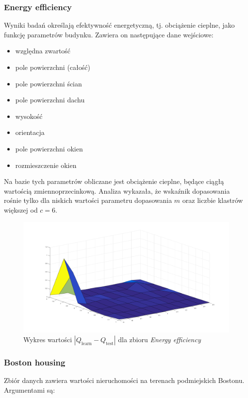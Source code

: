 \documentclass[a4paper; 11pt]{article}
\begin{document}
\subsubsection{Energy efficiency}
Wyniki badań określają efektywność energetyczną, tj. obciążenie cieplne, jako funkcję parametrów budynku.
Zawiera on następujące dane wejściowe:
\begin{itemize}
\item względna zwartość
\item pole powierzchni (całość)
\item pole powierzchni ścian
\item pole powierzchni dachu
\item wysokość
\item orientacja
\item pole powierzchni okien
\item rozmieszczenie okien
\end{itemize}
Na bazie tych parametrów obliczane jest obciążenie cieplne, będące ciągłą wartością zmiennoprzecinkową.
Analiza wykazała, że wskaźnik dopasowania rośnie tylko dla niskich wartości parametru dopasowania $m$ oraz
liczbie klastrów większej od $c = 6$. 

\begin{figure}[h]
    \centering
    \includegraphics[scale=0.3]{dq_energyeff.png}
    \caption{Wykres wartości $\left| Q_\text{learn} - Q_\text{test} \right|$ dla zbioru 
        \emph{Energy efficiency}}
    \label{fig:ee}
\end{figure}

\subsubsection{Boston housing}
Zbiór danych zawiera wartości nieruchomości na terenach podmiejskich Bostonu. Argumentami są:
\end{document}
